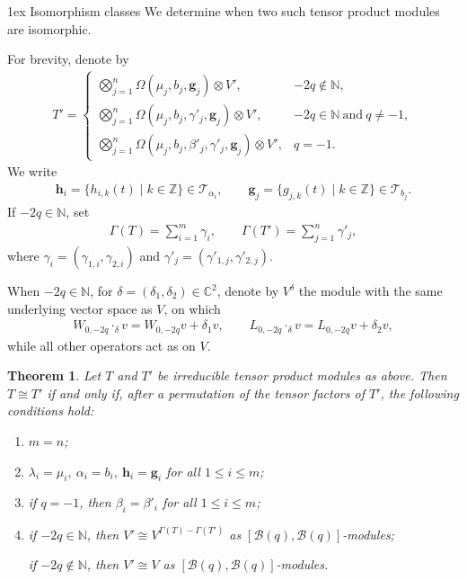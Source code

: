 \documentclass[a4paper]{amsart}
\makeatletter
\numberwithin{equation}{section}
\newtheorem{theorem}{Theorem}[section]
\def\subsection{\@startsection{subsection}{2}%
  \z@{1.5ex \@plus .5ex \@minus .2ex}%
  {1ex}%
  {\normalfont\bfseries}}
\makeatother
\begin{document}
\subsection{Isomorphism classes}
We determine when two such tensor product modules are isomorphic.

For brevity, denote by
\begin{align*}
T'=
\begin{cases}
\bigotimes_{j=1}^{n}\Omega(\mu_j,b_j,\mathbf g_j)\otimes V',
&-2q\notin\mathbb N,\\
\bigotimes_{j=1}^{n}\Omega(\mu_j,b_j,\gamma'_j,\mathbf g_j)\otimes V',
&-2q\in\mathbb N\ \text{and}\ q\neq-1,\\
\bigotimes_{j=1}^{n}
\Omega(\mu_j,b_j,\beta'_j,\gamma'_j,\mathbf g_j)\otimes V',
&q=-1.
\end{cases}
\end{align*}
We write
\begin{align*}
\mathbf h_i=\{h_{i,k}(t)\mid k\in\mathbb Z\}\in\mathcal T_{\alpha_i},
\qquad
\mathbf g_j=\{g_{j,k}(t)\mid k\in\mathbb Z\}\in\mathcal T_{b_j}.
\end{align*}
If $-2q\in\mathbb N$, set
\begin{align*}
\Gamma(T)=\sum_{i=1}^m\gamma_i,\qquad
\Gamma(T')=\sum_{j=1}^n\gamma'_j,
\end{align*}
where $\gamma_i=(\gamma_{1,i},\gamma_{2,i})$ and
$\gamma'_j=(\gamma'_{1,j},\gamma'_{2,j})$.

When $-2q\in\mathbb N$, for
$\delta=(\delta_1,\delta_2)\in\mathbb C^2$, denote by $V^\delta$
the module with the same underlying vector space as $V$, on which
\begin{align*}
W_{0,-2q}\mathbin{\cdot_\delta}v=W_{0,-2q}v+\delta_1v,\qquad
L_{0,-2q}\mathbin{\cdot_\delta}v=L_{0,-2q}v+\delta_2v,
\end{align*}
while all other operators act as on $V$.

\begin{theorem}
Let $T$ and $T'$ be irreducible tensor product modules as above.
Then $T\cong T'$ if and only if, after a permutation of the tensor
factors of $T'$, the following conditions hold:
\begin{enumerate}
\item $m=n$;
\item $\lambda_i=\mu_i,\ \alpha_i=b_i,\ \mathbf h_i=\mathbf g_i$
for all $1\leq i\leq m$;
\item if $q=-1$, then $\beta_i=\beta'_i$ for all $1\leq i\leq m$;
\item if $-2q\in\mathbb N$, then
$
V'\cong V^{\Gamma(T)-\Gamma(T')}
$
as $[\mathcal B(q),\mathcal B(q)]$-modules; 

if
$-2q\notin\mathbb N$, then
$
V'\cong V
$
as $[\mathcal B(q),\mathcal B(q)]$-modules.
\end{enumerate}
\end{theorem}
\end{document}
